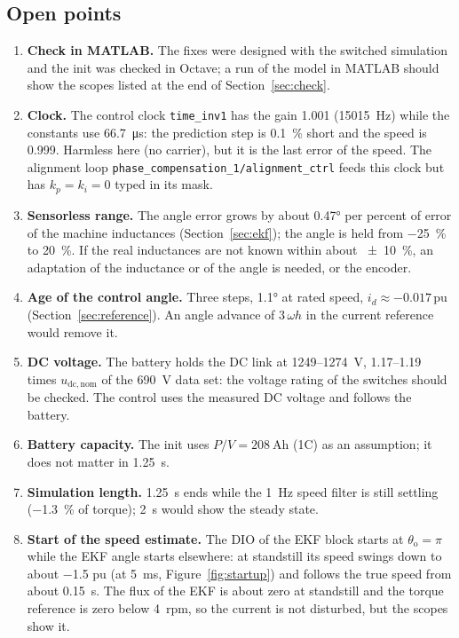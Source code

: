 \documentclass[11pt,a4paper]{scrartcl}
\newcommand{\ped}[1]{_{\mathrm{#1}}}
\newcommand{\code}[1]{\texttt{#1}}
\newcommand{\pun}{\,\mathrm{pu}}
\begin{document}
\begin{onehalfspace}
\section{Open points}
\label{sec:open}

\begin{enumerate}[nosep]
	\item \label{op:matlab} \textbf{Check in MATLAB.} The fixes were designed with the switched simulation and the init was checked in Octave; a run of the model in MATLAB should show the scopes listed at the end of Section~\ref{sec:check}.
	\item \label{op:clock} \textbf{Clock.} The control clock \code{time\_inv1} has the gain 1.001 (\SI{15015}{\hertz}) while the constants use \SI{66.7}{\micro\second}: the prediction step is \SI{0.1}{\percent} short and the speed is 0.999. Harmless here (no carrier), but it is the last error of the speed. The alignment loop \code{phase\_compensation\_1/alignment\_ctrl} feeds this clock but has $k_p = k_i = 0$ typed in its mask.
	\item \label{op:range} \textbf{Sensorless range.} The angle error grows by about \ang{0.47} per percent of error of the machine inductances (Section~\ref{sec:ekf}); the angle is held from \SI{-25}{\percent} to \SI{+20}{\percent}. If the real inductances are not known within about \SI{\pm 10}{\percent}, an adaptation of the inductance or of the angle is needed, or the encoder.
	\item \label{op:angle} \textbf{Age of the control angle.} Three steps, \ang{1.1} at rated speed, $i_d \approx -0.017\pun$ (Section~\ref{sec:reference}). An angle advance of $3\,\omega h$ in the current reference would remove it.
	\item \textbf{DC voltage.} The battery holds the DC link at 1249--\SI{1274}{\volt}, 1.17--1.19 times $u\ped{dc,nom}$ of the \SI{690}{\volt} data set: the voltage rating of the switches should be checked. The control uses the measured DC voltage and follows the battery.
	\item \textbf{Battery capacity.} The init uses $P/V = \SI{208}{\ampere\hour}$ (1C) as an assumption; it does not matter in \SI{1.25}{\second}.
	\item \textbf{Simulation length.} \SI{1.25}{\second} ends while the \SI{1}{\hertz} speed filter is still settling (\SI{-1.3}{\percent} of torque); \SI{2}{\second} would show the steady state.
	\item \label{op:start} \textbf{Start of the speed estimate.} The DIO of the EKF block starts at $\theta\ped{o} = \pi$ while the EKF angle starts elsewhere: at standstill its speed swings down to about \SI{-1.5}{} pu (at \SI{5}{\milli\second}, Figure~\ref{fig:startup}) and follows the true speed from about \SI{0.15}{\second}. The flux of the EKF is about zero at standstill and the torque reference is zero below \SI{4}{rpm}, so the current is not disturbed, but the scopes show it.

\end{enumerate}
\end{onehalfspace}
\end{document}
